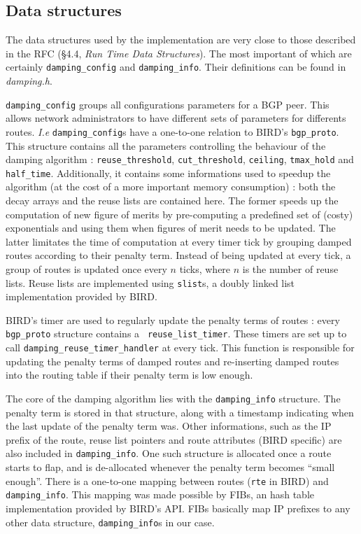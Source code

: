 \documentclass[a4paper,english]{IEEEtran}
\begin{document}
\subsection{Data structures}

The data structures used by the implementation are very close to 
those described in the RFC (\S4.4, \textit{Run Time Data Structures}).
The most important of which are certainly {\tt\small damping\_config} and
{\tt\small damping\_info}.
Their definitions can be found in {\sl damping.h}.

{\tt\small damping\_config} groups all configurations parameters for a BGP peer.
This allows network administrators to have different sets of parameters for
differents routes. {\it I.e} \texttt{\small damping\_config}s have a 
one-to-one relation to BIRD's \texttt{\small bgp\_proto}.
This structure contains all the parameters controlling the behaviour 
of the damping algorithm :
\texttt{\small reuse\_threshold}, \texttt{\small cut\_threshold}, 
\texttt{\small ceiling}, \texttt{\small tmax\_hold} and \texttt{\small half\_time}.
Additionally, it contains some informations used to speedup the algorithm
(at the cost of a more important memory consumption) : both the decay
arrays and the reuse lists are contained here. The former speeds up the
computation of new figure of merits by pre-computing a predefined set
of (costy) exponentials and using them when figures of merit needs to 
be updated.
The latter limitates the time of computation at every timer tick by 
grouping damped routes according to their penalty term.
Instead of being updated at every tick, a group of routes is updated 
once every $n$ ticks, where $n$ is the number of reuse lists.
Reuse lists are implemented using \texttt{\small slist}s, 
a doubly linked list implementation provided by BIRD.

BIRD's timer are used to regularly update the penalty terms of routes : 
every \texttt{\small bgp\_proto} structure contains a \texttt{\small 
reuse\_list\_timer}.
These timers are set up to call \texttt{\small damping\_reuse\_timer\_handler} 
at every tick.
This function is responsible for updating the penalty terms of 
damped routes and re-inserting damped routes into the routing table if their
penalty term is low enough.

The core of the damping algorithm lies with the \texttt{\small damping\_info} 
structure. The penalty term is stored in that structure, 
along with a timestamp indicating when the last update of the penalty term was.
Other informations, such as the IP prefix of the route, reuse list pointers 
and route attributes (BIRD specific) are also included in \texttt{\small damping\_info}.
One such structure is allocated once a route starts to flap, and is de-allocated 
whenever the penalty term becomes ``small enough''.
There is a one-to-one mapping between routes (\texttt{\small rte} in BIRD) 
and \texttt{\small damping\_info}. This mapping was made possible by FIBs, 
an hash table implementation provided by BIRD's API. FIBs basically map IP 
prefixes to any other data structure, {\tt\small damping\_info}s in our case.
\end{document}
